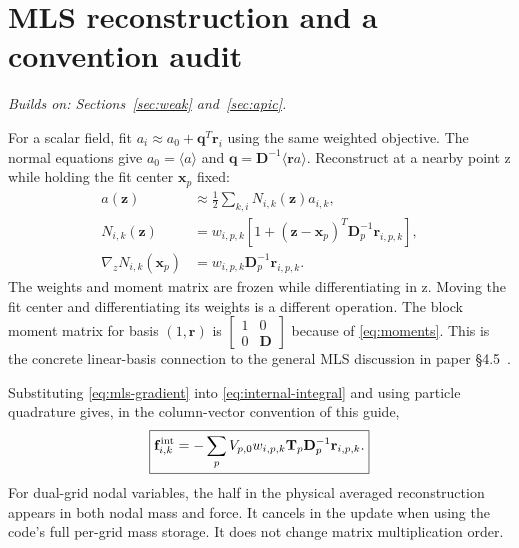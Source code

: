 \documentclass[11pt,a4paper]{article}
\newcommand{\mat}[1]{\mathbf{#1}}
\newcommand{\prereq}[1]{\textit{Builds on: #1}\par}
\numberwithin{equation}{section}
\begin{document}
\section{MLS reconstruction and a convention audit}\label{sec:mls}
\prereq{Sections~\ref{sec:weak} and~\ref{sec:apic}.}
For a scalar field, fit $a_i\approx a_0+\mat q^T\mat r_i$ using the same
weighted objective. The normal equations give
$a_0=\langle a\rangle$ and
$\mat q=\mat D^{-1}\langle\mat r a\rangle$.
Reconstruct at a nearby point z while holding the fit center $\mat x_p$ fixed:
\begin{align}
a(\mat z)&\approx\tfrac12\sum_{k,i}N_{i,k}(\mat z)a_{i,k},\\
N_{i,k}(\mat z)&=w_{i,p,k}
 [1+(\mat z-\mat x_p)^T\mat D_p^{-1}\mat r_{i,p,k}],\label{eq:mls-shape}\\
\nabla_zN_{i,k}(\mat x_p)&=w_{i,p,k}\mat D_p^{-1}\mat r_{i,p,k}.\label{eq:mls-gradient}
\end{align}
The weights and moment matrix are frozen while differentiating in z. Moving
the fit center and differentiating its weights is a different operation.
The block moment matrix for basis $(1,\mat r)$ is
$\left[\begin{smallmatrix}1&0\\0&\mat D\end{smallmatrix}\right]$ because of
\eqref{eq:moments}. This is the concrete linear-basis connection to the general
MLS discussion in paper \S4.5~\cite{mls}.

Substituting \eqref{eq:mls-gradient} into \eqref{eq:internal-integral} and using
particle quadrature gives, in the column-vector convention of this guide,
\begin{equation}\label{eq:mls-force}
\boxed{\mat f_{i,k}^{\rm int}
=-\sum_p V_{p,0}w_{i,p,k}\mat T_p\mat D_p^{-1}\mat r_{i,p,k}.}
\end{equation}
For dual-grid nodal variables, the half in the physical averaged reconstruction
appears in both nodal mass and force. It cancels in the update when using the
code's full per-grid mass storage. It does not change matrix multiplication
order.
\end{document}
